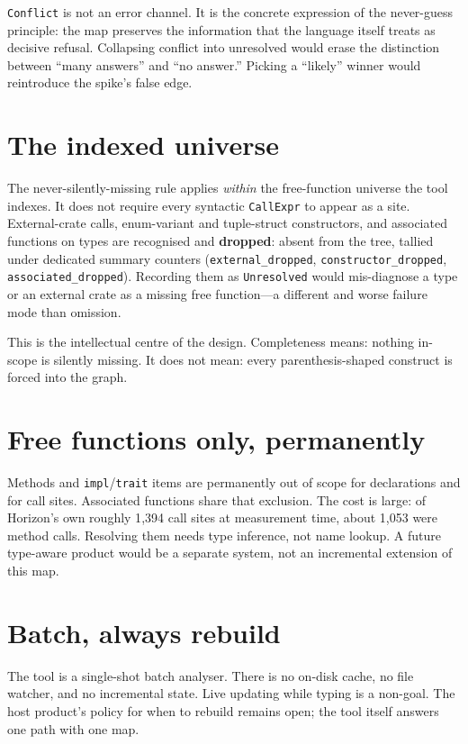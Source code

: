 \documentclass[11pt,a4paper,oneside]{report}
\newcommand{\horizon}{Horizon}
\begin{document}
\texttt{Conflict} is not an error channel. It is the concrete expression of
the never-guess principle: the map preserves the information that the language
itself treats as decisive refusal. Collapsing conflict into unresolved would
erase the distinction between ``many answers'' and ``no answer.'' Picking a
``likely'' winner would reintroduce the spike's false edge.

\section{The indexed universe}

The never-silently-missing rule applies \emph{within} the free-function
universe the tool indexes. It does not require every syntactic
\texttt{CallExpr} to appear as a site. External-crate calls, enum-variant and
tuple-struct constructors, and associated functions on types are recognised
and \textbf{dropped}: absent from the tree, tallied under dedicated summary
counters (\texttt{external\_dropped}, \texttt{constructor\_dropped},
\texttt{associated\_dropped}). Recording them as \texttt{Unresolved} would
mis-diagnose a type or an external crate as a missing free function---a
different and worse failure mode than omission.

This is the intellectual centre of the design. Completeness means: nothing
in-scope is silently missing. It does not mean: every parenthesis-shaped
construct is forced into the graph.

\section{Free functions only, permanently}

Methods and \texttt{impl}/\texttt{trait} items are permanently out of scope
for declarations and for call sites. Associated functions share that
exclusion. The cost is large: of \horizon{}'s own roughly 1{,}394 call sites
at measurement time, about 1{,}053 were method calls. Resolving them needs
type inference, not name lookup. A future type-aware product would be a
separate system, not an incremental extension of this map.

\section{Batch, always rebuild}

The tool is a single-shot batch analyser. There is no on-disk cache, no file
watcher, and no incremental state. Live updating while typing is a non-goal.
The host product's policy for when to rebuild remains open; the tool itself
answers one path with one map.
\end{document}
